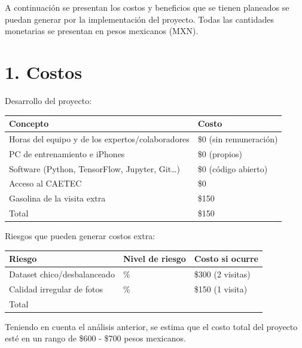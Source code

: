\documentclass[11pt,letterpaper,DIV=12]{scrartcl}
\begin{document}


A continuación se presentan los costos y beneficios que se tienen planeados se puedan generar por la implementación del proyecto. Todas las cantidades monetarias se presentan en pesos mexicanos (MXN).

\section{1. Costos}

Desarrollo del proyecto:

\medskip

\noindent
\begin{tabularx}{\textwidth}{>{\raggedright\arraybackslash}X>{\raggedright\arraybackslash}X}
  \toprule
  Concepto & Costo \\
  \midrule
  Horas del equipo y de los expertos/colaboradores & \$0 (sin remuneración) \\
  PC de entrenamiento e iPhones & \$0 (propios) \\
  Software (Python, TensorFlow, Jupyter, Git\dots) & \$0 (código abierto) \\
  Acceso al CAETEC & \$0 \\
  Gasolina de la visita extra & \$150 \\
  \midrule
  Total & \$150 \\
  \bottomrule
\end{tabularx}

\medskip

Riesgos que pueden generar costos extra:

\medskip

\noindent
\begin{tabularx}{\textwidth}{>{\raggedright\arraybackslash}X>{\raggedright\arraybackslash}X>{\raggedright\arraybackslash}X}
  \toprule
  Riesgo & Nivel de riesgo & Costo si ocurre \\
  \midrule
  Dataset chico/desbalanceado & 85\% & \$300 (2 visitas) \\
  Calidad irregular de fotos & 80\% & \$150 (1 visita) \\
  \midrule
  Total & \multicolumn{2}{r}{\$450} \\
  \bottomrule
\end{tabularx}

\medskip

Teniendo en cuenta el análisis anterior, se estima que el costo total del proyecto esté en un rango de \$600 - \$700 pesos mexicanos.
\end{document}
